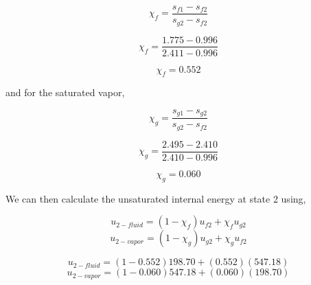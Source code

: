 \documentclass[10pt,parskip=half,
toc=sectionentrywithdots,
bibliography=totocnumbered,
captions=tableheading,numbers=noendperiod]{scrartcl}
\begin{document}
\begin{equation}\chi_f = \frac{s_{f1} - s_{f2}}{s_{g2}-s_{f2}}\end{equation}

\begin{equation}\chi_f = \frac{1.775 - 0.996}{2.411-0.996}\end{equation}

\begin{equation}\chi_f = 0.552\end{equation}

and for the saturated vapor,

\begin{equation}\chi_g = \frac{s_{g1} - s_{g2}}{s_{g2}-s_{f2}}\end{equation}

\begin{equation}\chi_g= \frac{2.495 - 2.410}{2.410-0.996}\end{equation}

\begin{equation}\chi_g = 0.060\end{equation}

We can then calculate the unsaturated internal energy at state 2 using,

\begin{equation}u_{2-fluid} = (1-\chi_f)u_{f2} + \chi_f u_{g2}\end{equation}
\begin{equation}u_{2-vapor} = (1-\chi_g)u_{g2} + \chi_g u_{f2}\end{equation}

\begin{equation}u_{2-fluid} = (1-0.552)198.70 + (0.552)(547.18)\end{equation}
\begin{equation}u_{2-vapor} = (1-0.060)547.18 + (0.060)(198.70)\end{equation}
\end{document}
